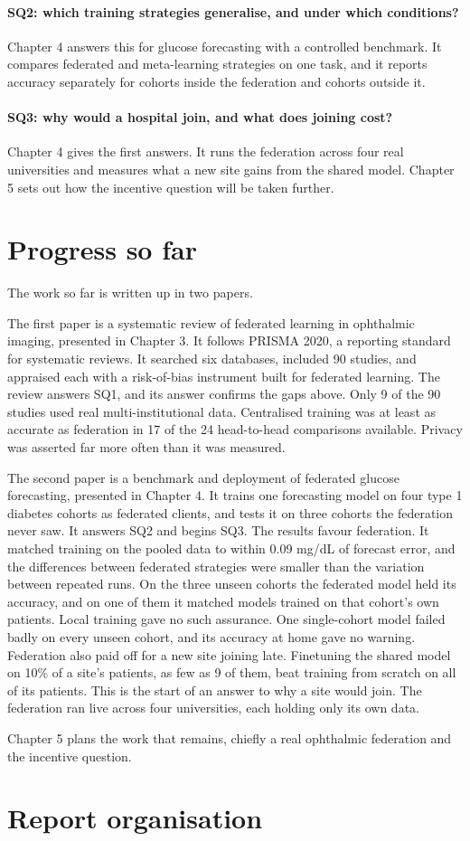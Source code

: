 \paragraph{SQ2: which training strategies generalise, and under which conditions?} Chapter 4 answers this for glucose forecasting with a controlled benchmark. It compares federated and meta-learning strategies on one task, and it reports accuracy separately for cohorts inside the federation and cohorts outside it.

\paragraph{SQ3: why would a hospital join, and what does joining cost?} Chapter 4 gives the first answers. It runs the federation across four real universities and measures what a new site gains from the shared model. Chapter 5 sets out how the incentive question will be taken further.

\section{Progress so far}
\label{sec:intro-progress}

The work so far is written up in two papers.

The first paper is a systematic review of federated learning in ophthalmic imaging, presented in Chapter 3. It follows PRISMA 2020, a reporting standard for systematic reviews. It searched six databases, included 90 studies, and appraised each with a risk-of-bias instrument built for federated learning. The review answers SQ1, and its answer confirms the gaps above. Only 9 of the 90 studies used real multi-institutional data. Centralised training was at least as accurate as federation in 17 of the 24 head-to-head comparisons available. Privacy was asserted far more often than it was measured.

The second paper is a benchmark and deployment of federated glucose forecasting, presented in Chapter 4. It trains one forecasting model on four type 1 diabetes cohorts as federated clients, and tests it on three cohorts the federation never saw. It answers SQ2 and begins SQ3. The results favour federation. It matched training on the pooled data to within 0.09 mg/dL of forecast error, and the differences between federated strategies were smaller than the variation between repeated runs. On the three unseen cohorts the federated model held its accuracy, and on one of them it matched models trained on that cohort's own patients. Local training gave no such assurance. One single-cohort model failed badly on every unseen cohort, and its accuracy at home gave no warning. Federation also paid off for a new site joining late. Finetuning the shared model on 10\% of a site's patients, as few as 9 of them, beat training from scratch on all of its patients. This is the start of an answer to why a site would join. The federation ran live across four universities, each holding only its own data.

Chapter 5 plans the work that remains, chiefly a real ophthalmic federation and the incentive question.

\section{Report organisation}
\label{sec:intro-org}

